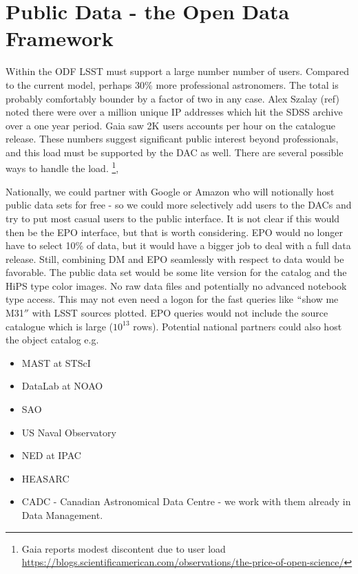 \section{Public Data - the Open Data Framework}\label{sec:public}

Within the ODF LSST must support a large number number of users. Compared to the current model, perhaps 30$\%$ more professional astronomers. The total is probably comfortably bounder by a factor of two in any case.
Alex Szalay (ref) noted there were over a million unique IP addresses which hit the SDSS archive over a one year period.  Gaia saw 2K users accounts per hour on the catalogue release. These numbers suggest significant public interest beyond professionals, and this load must be supported by the DAC as well. There are several possible ways to handle the load.
\footnote{Gaia reports modest discontent due to user load \url{https://blogs.scientificamerican.com/observations/the-price-of-open-science/}},

Nationally, we could partner with Google or Amazon who will notionally host public data sets for free - so we could more selectively add users to the DACs and try to put most casual users to the public interface. It is not clear if this would then be the EPO interface, but that is worth considering. EPO would no longer have to select 10\% of data, but it would have a bigger job to deal with a full data release. Still, combining DM and EPO seamlessly with respect to data would be favorable.
The public data set would be some lite version for the catalog   and the HiPS type color images. No raw data files and potentially no advanced notebook type access. This may not even need a logon for the fast queries like $``$show me M31$''$ with LSST sources plotted. EPO queries would not include the source catalogue which is large ($10^{13}$ rows).
Potential national partners  could also host the object catalog e.g.

\begin{itemize}
 \item MAST at STScI
 \item DataLab at NOAO
 \item SAO
 \item US Naval Observatory
 \item NED at IPAC
 \item HEASARC
 \item CADC - Canadian Astronomical Data Centre - we work with them already in Data Management.
\end{itemize}

